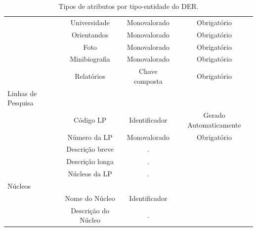 \documentclass[11pt]{../../classes/ifscarticle}
\begin{document}
\begin{table}[h]
\begin{tabular}{l|c|c|c|}
                  & Universidade        & Monovalorado    & Obrigatório                                          \\
                  & Orientandos         & Monovalorado    & Obrigatório                                          \\
                  & Foto                & Monovalorado    & Obrigatório                                          \\
                  & Minibiografia       & Monovalorado    & Obrigatório                                          \\
                  & Relatórios          & Chave composta  & Obrigatório                                          \\
    \hline
    Linhas de Pesquisa \\
                  & Código LP       & Identificador & Gerado Automaticamente \\
                  & Número da LP    & Monovalorado  & Obrigatório            \\
                  & Descrição breve & . &  \\
                  & Descrição longa & . &  \\
                  & Núcleos da LP & . &     \\
    \hline
    Núcleos \\
                  & Nome do Núcleo   & Identificador & \\
                  & Descrição do Núcleo   & .  & \\
    \hline
  \end{tabular}
  \caption{Tipos de atributos por tipo-entidade do DER.}
\end{table}




\end{document}
